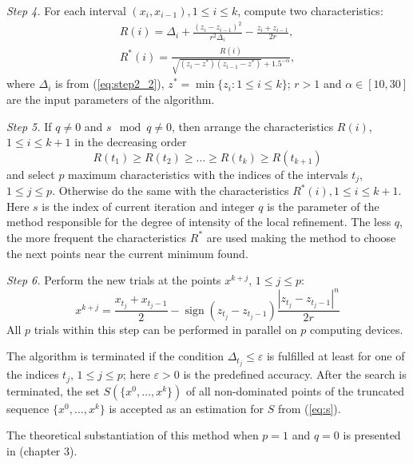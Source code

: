 \documentclass{llncs}
\DeclareMathOperator{\sign}{sign}
\begin{document}
\textit{Step 4.} For each interval \((x_i,x_{i-1}),1\leqslant i\leqslant k\), compute two
characteristics:
\begin{eqnarray}
  R(i) = \Delta_i + \frac{(z_i-z_{i-1})^2}{r^2\Delta_i}-\frac{z_i+z_{i-1}}{2r}, \\
  R^*(i)=\frac{R(i)}{\sqrt{(z_i-z^*)(z_{i-1}-z^*)} + 1.5^{-\alpha}},
\end{eqnarray}
where \(\Delta_i\) is from (\ref{eq:step2_2}), \(z^*=\min\{z_i:1\leqslant i\leqslant k\}\); \(r>1\) and
\(\alpha\in [10,30]\) are the input parameters of the algorithm.

\textit{Step 5.} If \(q\not=0\) and \(s \mod q\not=0 \), then arrange the characteristics \(R(i)\),
\(1 \leqslant i \leqslant k + 1\) in the decreasing order
\begin{equation*}
  R(t_1) \geqslant R(t_2) \geqslant \dots \geqslant R(t_k) \geqslant R(t_{k+1})
\end{equation*}
and select \(p\) maximum characteristics with the indices of the intervals \(t_j\), \(1 \leqslant j
\leqslant p\). Otherwise do the same with the characteristics \(R^*(i),1\leqslant i\leqslant k+1\).
Here \(s\) is the index of current iteration and integer \(q\) is the parameter of the method responsible
for the degree of intensity of the local refinement. The less \(q\), the more frequent the
characteristics \(R^*\) are used making the method to choose the next points near the current
minimum found.

\textit{Step 6.} Perform the new trials at the points \(x^{k+j}\), \(1 \leqslant j \leqslant p\):
\begin{equation}
  x^{k+j}=\frac{x_{t_j}+x_{t_j-1}}{2} - \sign(z_{t_j} - z_{t_j-1})\frac{|z_{t_j} - z_{t_j-
1}|^n}{2r}
\end{equation}
All \(p\) trials within this step can be performed in parallel on \(p\) computing devices.

The algorithm is terminated if the condition \(\Delta_{t_j}\leqslant \varepsilon\) is fulfilled at
least for one of the indices \(t_j\), \(1\leqslant j\leqslant p\); here \(\varepsilon >0\) is the
predefined accuracy.
After the search is terminated, the set \(S(\{x^0,\dots ,x^k\})\) of all
non-dominated points of the truncated sequence \(\{x^0,\dots ,x^k\}\) is accepted as an
estimation for \(S\) from (\ref{eq:s}).

The theoretical substantiation of this method when \(p=1\) and \(q=0\) is presented in
\cite{strOptBook}(chapter 3).
\end{document}
